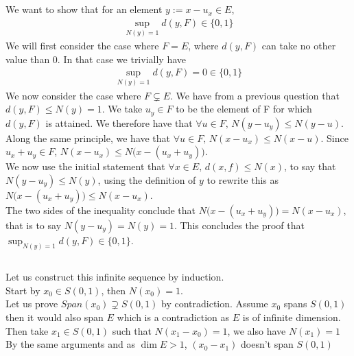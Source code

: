 \documentclass{article}
\begin{document}
\subsection{} %
We want to show that for an element $y:=x-u_x \in E$, 
\begin{align*}
	\sup _{N(y) = 1} d(y,F) \in \{ 0,1\}
\end{align*}
We will first consider the case where $F = E$, where $d(y,F)$ can take no other value than 0. In that case we trivially have
\begin{align*}
	\sup _{N(y) = 1} d(y,F) = 0 \in \{ 0,1\}
\end{align*}
We now consider the case where $F \subsetneq E$. We have from a previous question that $d(y,F) \leq N(y) = 1$. We take $u_y \in F$ to be the element of F for which $d(y,F)$ is attained. We therefore have that $\forall u \in F, \, N(y - u_y) \leq N(y - u)$. Along the same principle, we have that $\forall u \in F, \, N(x - u_x) \leq N(x - u)$. Since $u_x + u_y \in F$, $N(x - u_x) \leq N\big( x - (u_x + u_y)\big)$.\\
\noindent We now use the initial statement that $\forall x \in E, \, d(x,f) \leq N(x)$, to say that $N(y- u_y) \leq N(y)$, using the definition of $y$ to rewrite this as $N\big( x - (u_x + u_y)\big) \leq N(x - u_x)$.\\
\noindent The two sides of the inequality conclude that $N\big( x - (u_x + u_y)\big) = N(x - u_x)$, that is to say $N(y- u_y) = N(y) = 1$. This concludes the proof that $\sup _{N(y) = 1} d(y,F) \in \{ 0,1\}$.

\subsection{} %

Let us construct this infinite sequence by induction. \\

\noindent Start by $x_0 \in S(0,1)$, then $N(x_0)=1$. \\
Let us prove $Span(x_0) \supsetneq S(0,1)$ by contradiction. Assume $x_0$ spans $S(0,1)$ then it would also span $E$ which is a contradiction as $E$ is of infinite dimension. \\

\noindent Then take $x_1 \in S(0,1)$ such that $N(x_1-x_0)=1$, we also have $N(x_1)=1$ \\
By the same arguments and as $\dim E > 1$, $(x_0 - x_1)$ doesn't span $S(0,1)$ \\
\end{document}
